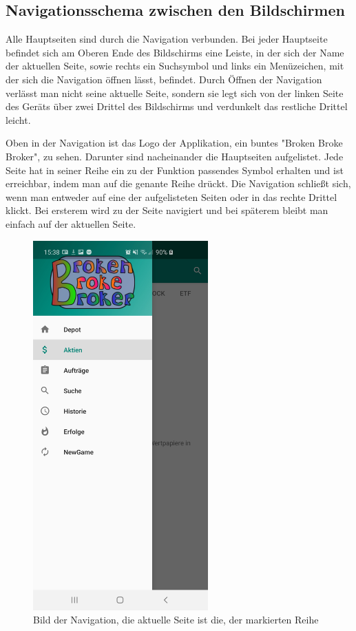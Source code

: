\documentclass[10pt]{scrartcl}
\begin{document}
\subsection{Navigationsschema zwischen den Bildschirmen}

Alle Hauptseiten sind durch die Navigation verbunden. Bei jeder Hauptseite befindet sich am Oberen Ende des Bildschirms eine Leiste, in der sich der Name der aktuellen Seite, sowie rechts ein Suchsymbol und  links ein Menüzeichen, mit der sich die Navigation öffnen lässt, befindet. Durch Öffnen der Navigation verlässt man nicht seine aktuelle Seite, sondern sie legt sich von der linken Seite des Geräts über zwei Drittel des Bildschirms und verdunkelt das restliche Drittel leicht. 

Oben in der Navigation ist das Logo der Applikation, ein buntes "Broken Broke Broker", zu sehen. Darunter sind nacheinander die Hauptseiten aufgelistet. Jede Seite hat in seiner Reihe ein zu der Funktion passendes Symbol erhalten und ist erreichbar, indem man auf die genante Reihe drückt. Die Navigation schließt sich, wenn man entweder auf eine der aufgelisteten Seiten oder in das rechte Drittel klickt. Bei ersterem wird zu der Seite navigiert und bei späterem bleibt man einfach auf der aktuellen Seite.

\begin{figure}[H]
	\centering
	\includegraphics[width=0.6\textwidth]{Bilder/Applikation/Navigation.jpg}
	\caption{Bild der Navigation, die aktuelle Seite ist die, der markierten Reihe}
\end{figure}
\end{document}
